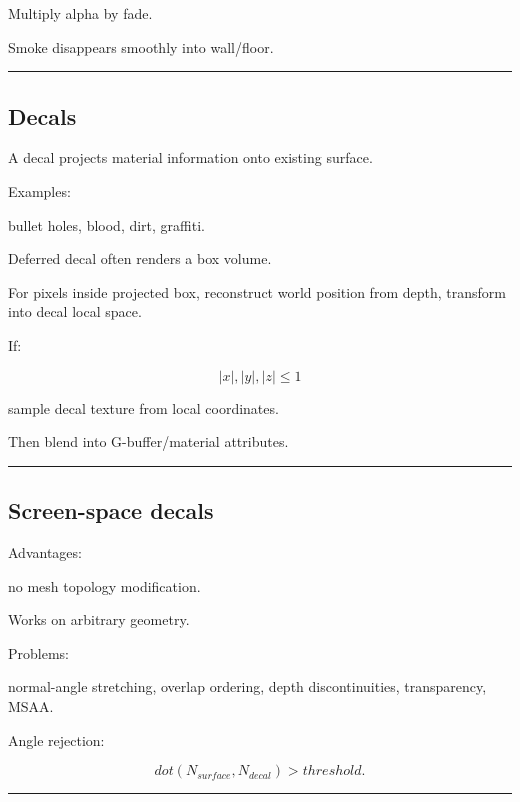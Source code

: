 Multiply alpha by fade.

Smoke disappears smoothly into wall/floor.

\begin{center}\rule{0.5\linewidth}{0.5pt}\end{center}

\subsection{Decals}\label{04-visual-computing-ii-ch040-decals}

\hypertarget{04-visual-computing-ii-ch040-decals}{}

A decal projects material information onto existing surface.

Examples:

bullet holes, blood, dirt, graffiti.

Deferred decal often renders a box volume.

For pixels inside projected box, reconstruct world position from depth, transform into decal local space.

If:

\[
|x|,|y|,|z|\le1
\]

sample decal texture from local coordinates.

Then blend into G-buffer/material attributes.

\begin{center}\rule{0.5\linewidth}{0.5pt}\end{center}

\subsection{Screen-space decals}\label{04-visual-computing-ii-ch040-screen-space-decals}

\hypertarget{04-visual-computing-ii-ch040-screen-space-decals}{}

Advantages:

no mesh topology modification.

Works on arbitrary geometry.

Problems:

normal-angle stretching, overlap ordering, depth discontinuities, transparency, MSAA.

Angle rejection:

\[
dot(N_{surface},N_{decal})
>
threshold.
\]

\begin{center}\rule{0.5\linewidth}{0.5pt}\end{center}

